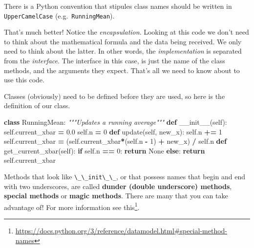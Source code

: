\documentclass[
  12pt,
  krantz2]{krantz}
\makeatletter
\newenvironment{Shaded}{\begin{snugshade}}{\end{snugshade}}
\newcommand{\CommentTok}[1]{\textcolor[rgb]{0.37,0.37,0.37}{\textit{#1}}}
\newcommand{\ControlFlowTok}[1]{\textcolor[rgb]{0.27,0.27,0.27}{\textbf{#1}}}
\newcommand{\DecValTok}[1]{\textcolor[rgb]{0.06,0.06,0.06}{#1}}
\newcommand{\FloatTok}[1]{\textcolor[rgb]{0.06,0.06,0.06}{#1}}
\newcommand{\FunctionTok}[1]{\textcolor[rgb]{0,0,0}{#1}}
\newcommand{\KeywordTok}[1]{\textcolor[rgb]{0.27,0.27,0.27}{\textbf{#1}}}
\newcommand{\NormalTok}[1]{#1}
\newcommand{\OperatorTok}[1]{\textcolor[rgb]{0.43,0.43,0.43}{\textbf{#1}}}
\newcommand{\VariableTok}[1]{\textcolor[rgb]{0,0,0}{#1}}
\renewcommand{\href}[2]{#2\footnote{\url{#1}}}
\newenvironment{kframe}{%
\medskip{}
\setlength{\fboxsep}{.8em}
 \def\at@end@of@kframe{}%
 \ifinner\ifhmode%
  \def\at@end@of@kframe{\end{minipage}}%
  \begin{minipage}{\columnwidth}%
 \fi\fi%
 \def\FrameCommand##1{\hskip\@totalleftmargin \hskip-\fboxsep
 \colorbox{shadecolor}{##1}\hskip-\fboxsep
     \hskip-\linewidth \hskip-\@totalleftmargin \hskip\columnwidth}%
 \MakeFramed {\advance\hsize-\width
   \@totalleftmargin\z@ \linewidth\hsize
   \@setminipage}}%
 {\par\unskip\endMakeFramed%
 \at@end@of@kframe}
\renewenvironment{Shaded}{\begin{kframe}}{\end{kframe}}
\makeatother
\begin{document}
There is a Python convention that stipules class names should be written in \texttt{UpperCamelCase} (e.g.~\texttt{RunningMean}).

That's much better! Notice the \emph{encapsulation}. Looking at this code we don't need to think about the mathematical formula and the data being received. We only need to think about the latter. In other words, the \emph{implementation} is separated from the \emph{interface}. The interface in this case, is just the name of the class methods, and the arguments they expect. That's all we need to know about to use this code.

Classes (obviously) need to be defined before they are used, so here is the definition of our class.

\begin{Shaded}
\begin{Highlighting}[]
\KeywordTok{class}\NormalTok{ RunningMean:}
  \CommentTok{"""Updates a running average"""}
  \KeywordTok{def} \FunctionTok{\_\_init\_\_}\NormalTok{(}\VariableTok{self}\NormalTok{):}
    \VariableTok{self}\NormalTok{.current\_xbar }\OperatorTok{=} \FloatTok{0.0}
    \VariableTok{self}\NormalTok{.n }\OperatorTok{=} \DecValTok{0}
  \KeywordTok{def}\NormalTok{ update(}\VariableTok{self}\NormalTok{, new\_x):}
    \VariableTok{self}\NormalTok{.n }\OperatorTok{+=} \DecValTok{1}
    \VariableTok{self}\NormalTok{.current\_xbar }\OperatorTok{=}\NormalTok{ (}\VariableTok{self}\NormalTok{.current\_xbar}\OperatorTok{*}\NormalTok{(}\VariableTok{self}\NormalTok{.n }\OperatorTok{{-}} \DecValTok{1}\NormalTok{) }\OperatorTok{+}\NormalTok{ new\_x) }\OperatorTok{/} \VariableTok{self}\NormalTok{.n}
  \KeywordTok{def}\NormalTok{ get\_current\_xbar(}\VariableTok{self}\NormalTok{):}
    \ControlFlowTok{if} \VariableTok{self}\NormalTok{.n }\OperatorTok{==} \DecValTok{0}\NormalTok{:}
      \ControlFlowTok{return} \VariableTok{None}
    \ControlFlowTok{else}\NormalTok{:}
      \ControlFlowTok{return} \VariableTok{self}\NormalTok{.current\_xbar}
\end{Highlighting}
\end{Shaded}

Methods that look like \texttt{\textbackslash{}\_\textbackslash{}\_init\textbackslash{}\_\textbackslash{}\_}, or that possess names that begin and end with two underscores, are called \textbf{dunder (double underscore) methods}, \textbf{special methods} or \textbf{magic methods}. There are many that you can take advantage of! For more information see \href{https://docs.python.org/3/reference/datamodel.html\#special-method-names}{this}.
\end{document}
